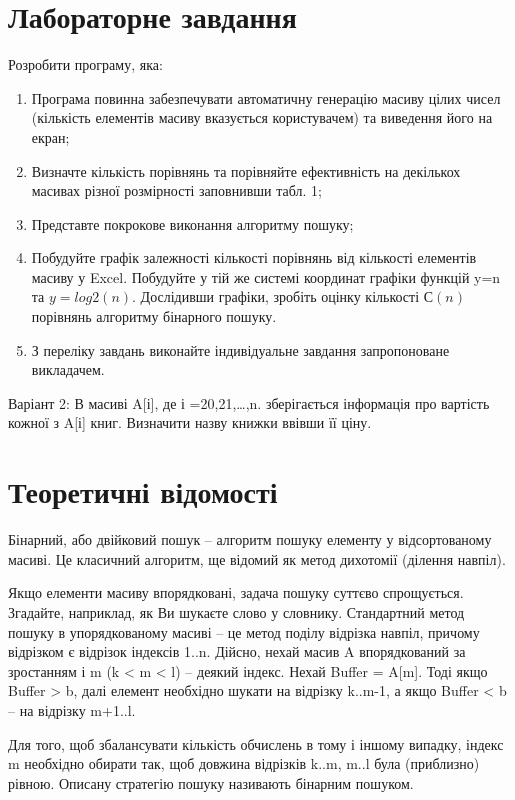 \documentclass{article}
\begin{document}
\begin{normalsize}
		\section*{Лабораторне завдання}

	Розробити програму, яка:
		\begin{center}
			\begin{enumerate}
				\item Програма повинна забезпечувати автоматичну генерацію масиву цілих чисел (кількість елементів масиву вказується користувачем) та виведення його на екран;
				\item Визначте кількість порівнянь та порівняйте ефективність на декількох масивах різної розмірності заповнивши табл. 1;
				\item Представте покрокове виконання алгоритму пошуку;
				\item Побудуйте графік залежності кількості порівнянь від кількості елементів масиву у Excel. Побудуйте у тій же системі координат графіки функцій y=n та $y=log2(n)$. Дослідивши графіки, зробіть оцінку кількості $С(n)$ порівнянь алгоритму бінарного пошуку. 
				\item  З переліку завдань виконайте індивідуальне завдання запропоноване викладачем.
			\end{enumerate}
		Варіант 2: В масиві A[і], де і =20,21,…,n. зберігається інформація про вартість кожної з A[і] книг. Визначити назву книжки ввівши її ціну.
		\end{center}
		
		\section*{Теоретичні відомості}
		Бінарний, або двійковий пошук – алгоритм пошуку елементу у відсортованому масиві. Це класичний алгоритм, ще відомий як метод дихотомії (ділення навпіл).
		
		Якщо елементи масиву впорядковані, задача пошуку суттєво спрощується. Згадайте, наприклад, як Ви шукаєте слово у словнику. Стандартний метод пошуку в упорядкованому масиві – це метод поділу відрізка навпіл, причому відрізком є відрізок індексів 1..n. Дійсно, нехай масив A впорядкований за зростанням і m (k < m < l) – деякий індекс. Нехай Buffer = A[m]. Тоді якщо Buffer > b, далі елемент необхідно шукати на відрізку k..m-1, а якщо Buffer < b – на відрізку m+1..l.
		
		Для того, щоб збалансувати кількість обчислень в тому і іншому випадку, індекс m необхідно обирати так, щоб довжина відрізків k..m, m..l була (приблизно) рівною. Описану стратегію пошуку називають бінарним пошуком.
		

\end{normalsize}
\end{document}
